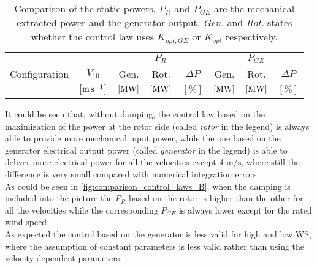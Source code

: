 \begin{table}[htb]
  \centering
  \caption{Comparison of the static powers. $P_R$ and $P_{GE}$ are the mechanical extracted power and the generator output. \textit{Gen.} and \textit{Rot.} states whether the control law uses $K_{opt,GE}$ or $K_{opt}$ respectively.}
  \begin{tabular}{cc|ccc|ccc}
    \toprule
    & & \multicolumn{3}{c|}{$P_R$} & \multicolumn{3}{c}{$P_{GE}$} \\
    Configuration & $V_{10}$ & Gen.  & Rot.& $\Delta P$  & Gen.  & Rot.& $\Delta P$ \\ 
    & $\left[\si{\meter\per\second}\right]$ & $\left[\si{\mega\watt}\right]$ & $\left[\si{\mega\watt}\right]$ & $\left[\%\right]$ & $\left[\si{\mega\watt}\right]$ & $\left[\si{\mega\watt}\right]$ & $\left[\%\right]$ \\  \midrule
     
     
  \end{tabular}
  \label{tab:comp_powers}
\end{table}

It could be seen that, without damping, the control law based on the maximization of the power at the rotor side (called \textit{rotor} in the legend) is always able to provide more mechanical input power, while the one based on the generator electrical output power (called \textit{generator} in the legend) is able to deliver more electrical power for all the velocities except 4 $\si{\meter\per\second}$, where still the difference is very small compared with numerical integration errors.  \\
As could be seen in \autoref{fig:comparison_control_laws_B}, when the damping is included into the picture the $P_R$ based on the rotor is higher than the other for all the velocities while the corresponding $P_{GE}$ is always lower except for the rated wind speed.\\
As expected the control based on the generator is less valid for high and low WS, where the assumption of constant parameters is less valid rather than using the velocity-dependent parameters. 

